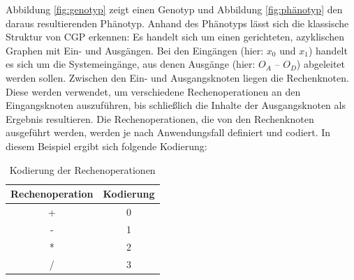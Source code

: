 Abbildung \ref{fig:genotyp} zeigt einen Genotyp und Abbildung \ref{fig:phänotyp} den daraus resultierenden Phänotyp.
Anhand des Phänotyps lässt sich die klassische Struktur von CGP erkennen:
Es handelt sich um einen gerichteten, azyklischen Graphen mit Ein- und Ausgängen.
Bei den Eingängen (hier: $x_0$ und $x_1$) handelt es sich um die Systemeingänge, aus denen Ausgänge (hier: $O_A$ – $O_D$) abgeleitet werden sollen.
Zwischen den Ein- und Ausgangsknoten liegen die Rechenknoten.
Diese werden verwendet, um verschiedene Rechenoperationen an den Eingangsknoten auszuführen, bis schließlich die Inhalte der Ausgangsknoten als Ergebnis resultieren.
Die Rechenoperationen, die von den Rechenknoten ausgeführt werden, werden je nach Anwendungsfall definiert und codiert.
In diesem Beispiel ergibt sich folgende Kodierung:

\begin{table}[h]
    \centering
    \begin{tabular}{c|c}
       \textbf{Rechenoperation} & \textbf{Kodierung} \\ \hline
        + & 0 \\ \hline
        - & 1 \\ \hline
        * & 2 \\ \hline
        / & 3
    \end{tabular}
    \caption{Kodierung der Rechenoperationen}
    \label{table:kodierung}
\end{table}


